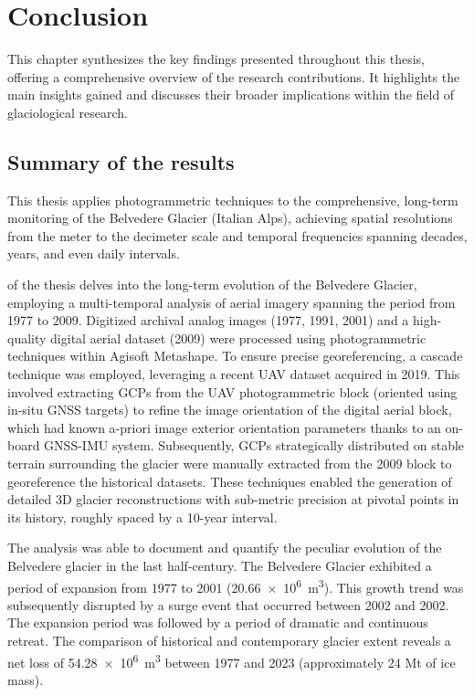 \chapter{Conclusion}
\label{ch:conclusion}

This chapter synthesizes the key findings presented throughout this thesis, offering a comprehensive overview of the research contributions. 
It highlights the main insights gained and discusses their broader implications within the field of glaciological research.

\section{Summary of the results}

This thesis applies photogrammetric techniques to the comprehensive, long-term monitoring of the Belvedere Glacier (Italian Alps), achieving spatial resolutions from the meter to the decimeter scale and temporal frequencies spanning decades, years, and even daily intervals.

 of the thesis delves into the long-term evolution of the Belvedere Glacier, employing a multi-temporal analysis of aerial imagery spanning the period from 1977 to 2009. 
Digitized archival analog images (1977, 1991, 2001) and a high-quality digital aerial dataset (2009) were processed using photogrammetric techniques within Agisoft Metashape.
To ensure precise georeferencing, a cascade technique was employed, leveraging a recent UAV dataset acquired in 2019.
This involved extracting GCPs from the UAV photogrammetric block (oriented using in-situ GNSS targets) to refine the image orientation of the digital aerial block, which had known a-priori image exterior orientation parameters thanks to an on-board GNSS-IMU system. 
Subsequently, GCPs strategically distributed on stable terrain surrounding the glacier were manually extracted from the 2009 block to georeference the historical datasets.
These techniques enabled the generation of detailed 3D glacier reconstructions with sub-metric precision at pivotal points in its history, roughly spaced by a 10-year interval.

The analysis was able to document and quantify the peculiar evolution of the Belvedere glacier in the last half-century.
The Belvedere Glacier exhibited a period of expansion from 1977 to 2001 (\SI{+20.66e6}{\cubic\meter}). 
This growth trend was subsequently disrupted by a surge event that occurred between 2002 and 2002.
The expansion period was followed by a period of dramatic and continuous retreat.  
The comparison of historical and contemporary glacier extent reveals a net loss of \SI{54.28e6}{\cubic\meter} between 1977 and 2023 (approximately 24 Mt of ice mass).

